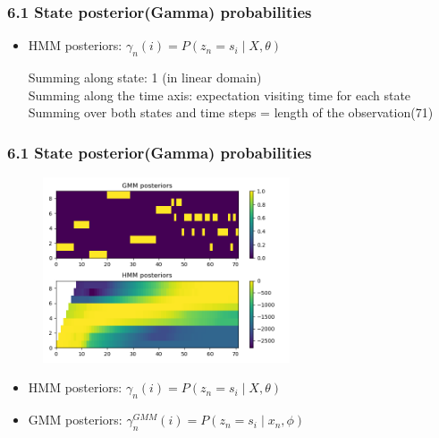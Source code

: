 \documentclass[t]{beamer}
\begin{document}
\begin{frame}
	\frametitle{6.1 State posterior(Gamma) probabilities}
	\begin{itemize}
		\item HMM posteriors: $\gamma_n(i) = P(z_n = s_i \mid X, \theta)$
		
		Summing along state: 1 (in linear domain)\\


		Summing along the time axis: expectation visiting time for each state\\

		
		Summing over both states and time steps = length of the observation(71)\\

	\end{itemize}

\end{frame}
	
\begin{frame}
\frametitle{6.1 State posterior(Gamma) probabilities}
	\begin{figure}
		\centering
		\includegraphics[width=0.65\textwidth]{figures/61.png}
	\end{figure}
	\begin{itemize}
		\item HMM posteriors: $\gamma_n(i) = P(z_n = s_i \mid X, \theta)$
		\item GMM posteriors: $\gamma_n^{GMM}(i) = P(z_n = s_i \mid x_n, \phi)$
	\end{itemize}


\end{frame}
\end{document}
